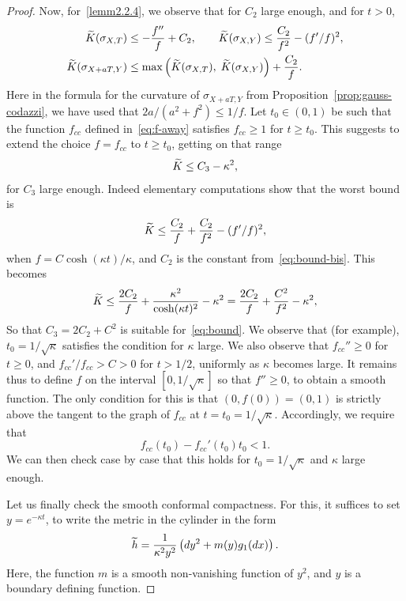 \documentclass[10pt]{amsart}
\theoremstyle{definition}\newtheorem{defi}[theo]{Definition}\newtheorem{rema}[theo]{Remark}\newtheorem{exam}[theo]{Example}\newtheorem{exem}[theo]{Example}\newtheorem{nota}[theo]{Notation}
\theoremstyle{plain}
\let\oldtilde\tilde
\renewcommand*{\tilde}[1]{\mathchoice{\widetilde{#1}}{\widetilde{#1}}{\oldtilde{#1}}{\oldtilde{#1}}}
\begin{document}
\begin{proof}
Now, for~\eqref{lemm2.2.4}, we observe that for $C_2$ large enough, and for $t > 0$,
\begin{align}\label{eq:bound-bis}
\tilde{K}(\sigma_{X,T}) &\leq - \frac{f''}{f} + C_2,\qquad \tilde{K}(\sigma_{X,Y}) \leq \frac{C_2}{f^2} - (f'/f)^2,
\\
\tilde{K}(\sigma_{X+aT,Y}) &\leq \max\left(\tilde{K}(\sigma_{X,T}),\; \tilde{K}(\sigma_{X,Y})\right) + \frac{C_2}{f}.\nonumber
\end{align}
Here in the formula for the curvature of $\sigma_{X+aT,Y}$ from Proposition~\ref{prop:gauss-codazzi}, we have used that $2a/(a^2+f^2)\leq 1/f$. Let $t_0\in(0,1)$ be such that the function $f_{cc}$ defined in~\eqref{eq:f-away} satisfies $f_{cc}\geq 1$ for $t\geq t_0$. This suggests to extend the choice $f=f_{cc}$ to $t\geq t_0$, getting on that range
\begin{equation}\label{eq:bound}
\tilde{K} \leq C_3 - \kappa^2,
\end{equation}
for $C_3$ large enough. Indeed elementary computations show that the worst bound is
\[
\tilde{K} \leq \frac{C_2}{f} + \frac{C_2}{f^2} - (f'/f)^2,
\]
when $f= C \cosh(\kappa t)/\kappa$, and $C_2$ is the constant from~\eqref{eq:bound-bis}. This becomes
\[
\tilde{K} \leq \frac{2C_2}{f} + \frac{\kappa^2}{\cosh(\kappa t)^2} - \kappa^2 = \frac{2C_2}{f} + \frac{C^2}{f^2} - \kappa^2,
\]
So that $C_3= 2C_2 +C^2$ is suitable for~\eqref{eq:bound}. We observe that (for example), $t_0 = 1/\sqrt{\kappa}$ satisfies the condition for $\kappa$ large. We also observe that $f_{cc}''\geq 0$ for $t\geq 0$, and $f_{cc}'/f_{cc}> C>0$ for $t>1/2$, uniformly as $\kappa$ becomes large. It remains thus to define $f$ on the interval $[0,1/\sqrt{\kappa}]$ so that $f''\geq 0$, to obtain a smooth function. The only condition for this is that $(0,f(0))=(0,1)$ is strictly above the tangent to the graph of $f_{cc}$ at $t=t_0 =1/\sqrt{\kappa}$. Accordingly, we require that
\[
f_{cc}(t_0) - f_{cc}'(t_0) t_0 < 1.
\]
We can then check case by case that this holds for $t_0 = 1/\sqrt{\kappa}$ and $\kappa$ large enough.

Let us finally check the smooth conformal compactness. For this, it suffices to set $y = e^{-\kappa t}$, to write the metric in the cylinder in the form
\[
\tilde{h} = \frac{1}{\kappa^2 y^2}\left(dy^2 + m(y)g_1(dx)\right).
\]
Here, the function $m$ is a smooth non-vanishing function of $y^2$, and $y$ is a boundary defining function.
\end{proof}
\end{document}

